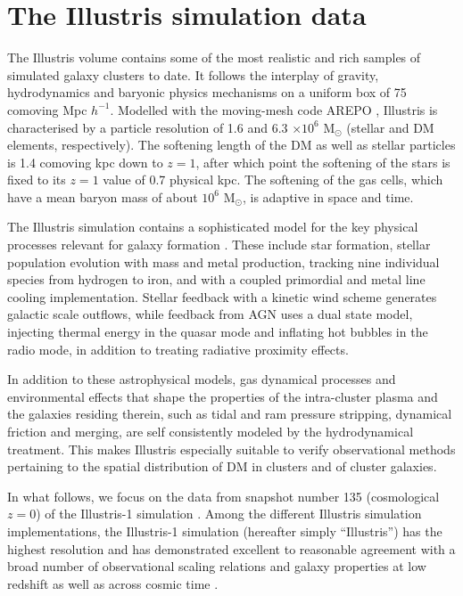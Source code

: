 \documentclass[usenatbib]{mn2e}
\begin{document}
{%
\section{The Illustris simulation data} 
\label{sec:illustris_sim}

The Illustris volume \citep{Vogelsberger2014, Vogelsberger:2014b, Genel:2014,Sijacki:2015}  contains some of the most realistic and rich samples of simulated galaxy clusters to date. It follows the interplay of gravity, hydrodynamics and baryonic physics mechanisms on a uniform box of 75 comoving Mpc $h^{-1}$. 
%
Modelled with the moving-mesh code {\sc AREPO} \citep{Springel2010}, Illustris is characterised by a particle resolution of 1.6 and 6.3 $\times 10^6$ M$_\odot $ (stellar and DM elements, respectively). The softening length of the DM as well as stellar particles is 1.4 comoving kpc down to $z=1$, after which point the softening of the stars is fixed to its $z=1$ value of 0.7 physical kpc. The softening of the gas cells, which have a mean baryon mass of about $10^6$ M$_\odot $, is adaptive in space and time.

The Illustris simulation contains a sophisticated model for the key physical processes relevant for galaxy formation \citep{Vogelsberger:2013b, Torrey:2014a}. These include star formation, stellar population evolution with mass and metal production, tracking nine individual species from hydrogen to iron, and with a coupled primordial and metal line cooling implementation. Stellar feedback with a kinetic wind scheme generates galactic scale outflows, while feedback from AGN uses a dual state model, injecting thermal energy in the quasar mode and inflating hot bubbles in the radio mode, in addition to treating radiative proximity effects.

In addition to these astrophysical models, gas dynamical processes and environmental effects that shape the properties of the intra-cluster plasma and the galaxies residing therein, such as tidal and ram pressure stripping, dynamical friction and merging, are self consistently modeled by the hydrodynamical treatment. This makes Illustris especially suitable to verify observational methods pertaining to the spatial distribution of DM in clusters and of cluster galaxies.

In what follows, we focus on the data from snapshot number 135 (cosmological $z=0$) of the Illustris-1 simulation \citep{Nelson:2015b}. Among the different Illustris simulation implementations,
the Illustris-1 simulation (hereafter simply ``Illustris'') has the highest resolution and has demonstrated excellent to reasonable agreement with a broad number of observational scaling relations and galaxy properties at low redshift \citep{Vogelsberger:2014b,Sales:2015,Torrey:2015,Snyder:2015} as well as across cosmic time \citep{Genel:2014}.


}
\end{document}
